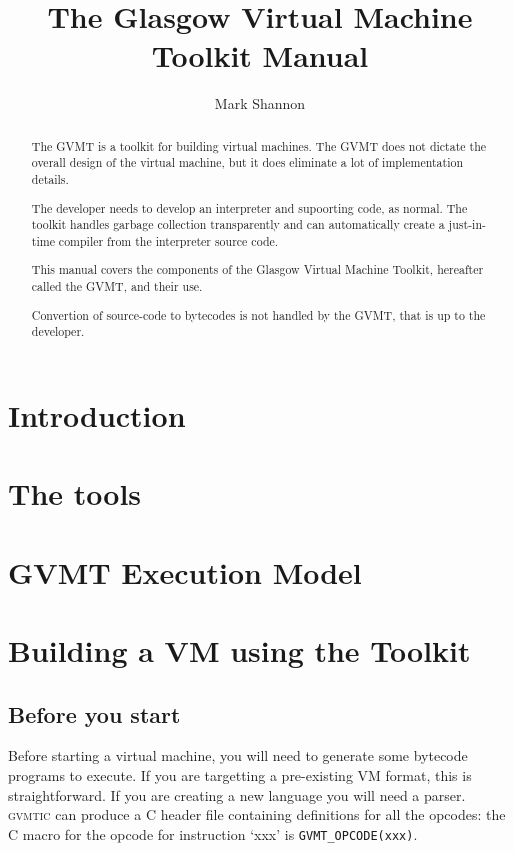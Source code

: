 \documentclass[a4paper,10pt]{report}
\title{The Glasgow Virtual Machine Toolkit Manual}
\author{Mark Shannon}
\date{ }
\newcommand{\gvmtic}{\textsc{gvmtic}}
\begin{document}
\maketitle 

\begin{abstract}
The GVMT is a toolkit for building virtual machines. The GVMT does not dictate the overall design of the virtual machine, but it does eliminate a lot of implementation details. 

The developer needs to develop an interpreter and supoorting code, as normal. The toolkit handles garbage collection transparently
and can automatically create a just-in-time compiler from the interpreter source code.

This manual covers the components of the Glasgow Virtual Machine Toolkit, hereafter called the GVMT, and their use. 

Convertion of source-code to bytecodes is not handled by the GVMT, that is up to the developer.

\tableofcontents

\end{abstract}


\chapter{Introduction}



\chapter{The tools\label{chap:tools}}



\chapter{GVMT Execution Model\label{chap:abstract}}



\chapter{Building a VM using the Toolkit}

\section{Before you start}
Before starting a virtual machine, you will need to generate some bytecode programs to execute. If you are targetting a pre-existing VM format, this is straightforward. If you are creating a new language you will need a parser. \gvmtic{} can produce a C header file containing definitions for all the opcodes: the C macro for the opcode for instruction `xxx' is \verb|GVMT_OPCODE(xxx)|.
\end{document}
